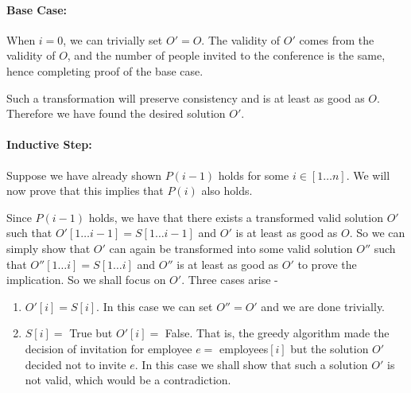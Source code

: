 \documentclass[answers]{exam}
\begin{document}
\begin{questions}
\begin{solution}
\paragraph{Base Case:} When $i = 0$, we can trivially set $O' = O$. The validity of $O'$ comes from the validity of $O$, and the number of people invited to the conference is the same, hence completing proof of the base case.%


Such a transformation will preserve consistency and is at least as good as $O$. Therefore we have found the desired solution $O'$.

\paragraph{Inductive Step:} Suppose we have already shown $P(i-1)$ holds for some $i \in [1 \ldots n]$. We will now prove that this implies that $P(i)$ also holds.

Since $P(i-1)$ holds, we have that there exists a transformed valid solution $O'$ such that $O'[1 \ldots i-1] = S[1 \ldots i-1]$ and $O'$ is at least as good as $O$. So we can simply show that $O'$ can again be transformed into some valid solution $O''$ such that $O''[1 \ldots i] = S[1 \ldots i]$ and $O''$ is at least as good as $O'$ to prove the implication. So we shall focus on $O'$. Three cases arise -

\begin{enumerate}
    
    \item $O'[i] = S[i]$. In this case we can set $O'' = O'$ and we are done trivially.
    
    \item $S[i] =$ True but $O'[i] =$ False. That is, the greedy algorithm made the decision of invitation for employee $e=$ employees$[i]$ but the solution $O'$ decided not to invite $e$. In this case we shall show that such a solution $O'$ is not valid, which would be a contradiction.
    

\end{enumerate}
\end{solution}
\end{questions}
\end{document}

